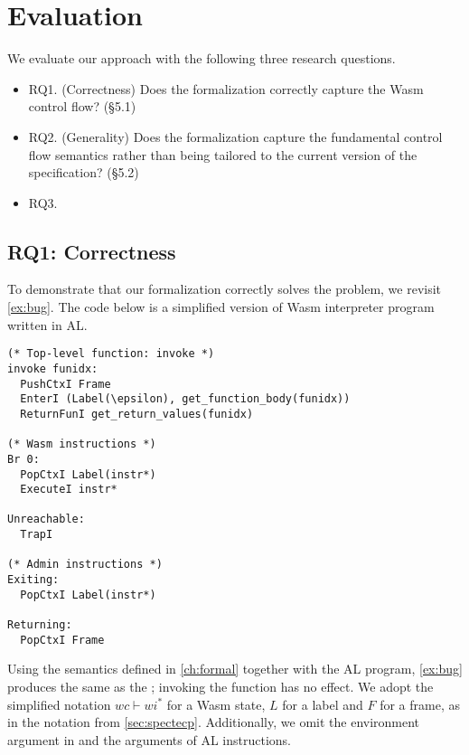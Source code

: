 
\chapter{Evaluation}
\label{ch:eval}
\noindent

We evaluate our approach with the following three research questions.
\begin{itemize}
  \item RQ1. (Correctness) Does the formalization correctly capture the Wasm
    control flow? (\S 5.1)
  \item RQ2. (Generality) Does the formalization capture the fundamental
    control flow semantics rather than being tailored to the current version of
    the specification? (\S 5.2)
  \item RQ3. 
\end{itemize}

\section{RQ1: Correctness}
To demonstrate that our formalization correctly solves the problem, we revisit
\cref{ex:bug}.
The code below is a simplified version of Wasm interpreter program written in AL.
\begin{verbatim}
(* Top-level function: invoke *)
invoke funidx:
  PushCtxI Frame
  EnterI (Label(\epsilon), get_function_body(funidx))
  ReturnFunI get_return_values(funidx)

(* Wasm instructions *)
Br 0:
  PopCtxI Label(instr*)
  ExecuteI instr*

Unreachable:
  TrapI

(* Admin instructions *)
Exiting:
  PopCtxI Label(instr*)

Returning:
  PopCtxI Frame

\end{verbatim}
Using the semantics defined in \cref{ch:formal} together with the AL program,
\cref{ex:bug} produces the same as the \officialp{}; invoking the function has
no effect.
We adopt the simplified notation $wc \vdash wi^*$ for a Wasm state, $L$ for a
label and $F$ for a frame, as in the notation from \cref{sec:spectecp}.
Additionally, we omit the environment argument in \algo{} and the arguments of AL
instructions.

